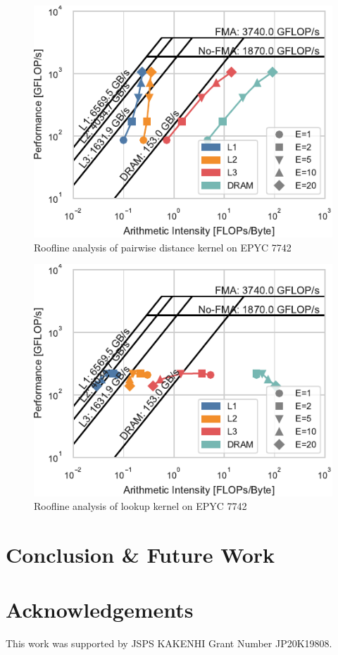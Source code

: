 \documentclass[conference]{IEEEtran}
\begin{document}
\begin{figure}
    \centering
    \includegraphics{figs/roofline_distances_epyc}
    \caption{Roofline analysis of pairwise distance kernel on EPYC 7742}%
    \label{fig:architecture}
\end{figure}

\begin{figure}
    \centering
    \includegraphics{figs/roofline_lookup_epyc}
    \caption{Roofline analysis of lookup kernel on EPYC 7742}%
    \label{fig:architecture}
\end{figure}

\section{Conclusion \& Future Work}

\section*{Acknowledgements}
This work was supported by JSPS KAKENHI Grant Number JP20K19808.



\end{document}
